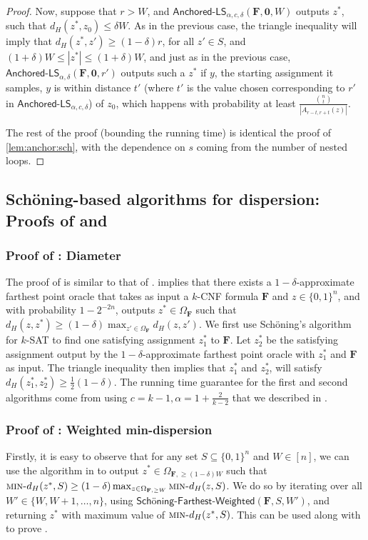 \documentclass[11pt, letterpaper]{article}
\theoremstyle{definition}
\newcommand{\Q}[1]{\{0,1\}^{#1}}
\newcommand{\f}{\mathbf{F}}
\newcommand{\Om}{\Omega_{\f}}
\newcommand{\LS}{\textsf{LS}}
\newcommand{\ALS}{\textsf{Anchored-}\LS}
\newcommand{\mind}{\textsc{min-}d_H}
\newcommand{\sch}{Sch\"{o}ning\xspace}
\begin{document}
\begin{proof}
Now, suppose that $r > W$, and $\ALS_{\alpha, c ,\delta}(\f, \mathbf{0},W)$ outputs $z^*$, such that $d_H(z^*, z_0) \leq \delta W$. As in the previous case, the triangle inequality will imply that $d_H(z^*,z') \geq (1-\delta)r$, for all $z' \in S$, and $(1+\delta) W \leq |z^*| \leq (1+\delta) W$, and just as in the previous case, $\ALS_{\alpha,\delta}(\f, \mathbf{0}, r')$ outputs such a $z^*$ if $y$, the starting assignment it samples, $y$ is within distance $t'$ (where $t'$ is the value chosen corresponding to $r'$ in $\ALS_{\alpha, c ,\delta}$) of $z_0$, which happens with probability at least $\frac{\binom{n}{t}}{|A_{r-t , r+t}(z)|}$.

The rest of the proof (bounding the running time) is identical the proof of \cref{lem:anchor:sch}, with the dependence on $s$ coming from the number of nested loops.
\end{proof}


\subsection{\sch-based algorithms for dispersion: Proofs of  and } \label{sec:schfinal}
\subsubsection*{Proof of : Diameter}
The proof of  is similar to that of .  implies  that there exists a $1-\delta$-approximate farthest point oracle that takes as input a $k$-CNF formula $\f$ and $z \in \Q{n}$, and with probability $1-2^{-2n}$, outputs $z^* \in \Om$ such that $d_H(z,z^*) \geq (1-\delta) \max_{z' \in \Om} d_H(z,z')$. We first use \sch's algorithm for $k$-SAT to find one satisfying assignment $z_1^*$ to $\f$. Let $z_2^*$ be the satisfying assignment output by the $1-\delta$-approximate farthest point oracle with $z^*_1$ and $\f$ as input. The triangle inequality then implies that $z_1^*$ and $z_2^*$, will satisfy $d_H(z_1^*, z_2^*) \geq \frac{1}{2} (1-\delta)$. The running time guarantee for the first and second algorithms come from using $c=k-1, \alpha=1+\frac{2}{k-2}$ that we described in . 

\subsubsection*{Proof of : Weighted min-dispersion}
Firstly, it is easy to observe that for any set $S \subseteq \Q{n}$ and $W \in [n]$, we can use the algorithm in  to output $z^* \in \Omega_{\f, \geq (1-\delta )W}$ such that $\mind( z^*, S) \geq (1-\delta) \max_{z \in \Omega_{\f, \geq W}} \mind(z, S)$. We do so by iterating over all $W' \in \{W, W+1, \dots, n\}$, using $\textsf{\sch-Farthest-Weighted}(\f, S, W')$, and returning $z^*$ with maximum value of $\mind(z^*, S)$. This can be used along with  to prove .
\end{document}
